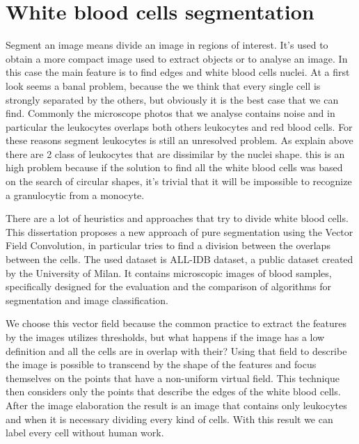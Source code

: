 \section*{White blood cells segmentation}
Segment an image means divide an image in regions of interest. It's used to obtain a more compact image used to extract objects or to analyse an image. In this case the main feature is to find edges and white blood cells nuclei. At a first look seems a banal problem, because the we think that every single cell is strongly separated by the others, but obviously it is the best case that we can find. Commonly the microscope photos that we analyse contains noise and in particular the leukocytes overlaps both others leukocytes and red blood cells. For these reasons segment leukocytes is still an unresolved problem. As explain above there are 2 class of leukocytes that are dissimilar by the nuclei shape. this is an high problem because if the solution to find all the white blood cells was based on the search of circular shapes, it's trivial that it will be impossible to recognize a granulocytic from a monocyte.


\bigskip


There are a lot of heuristics and approaches that try to divide white blood cells. This dissertation proposes a new approach of pure segmentation using the Vector Field Convolution, in particular tries to find a division between the overlaps between the cells. The used dataset is ALL-IDB dataset, a public dataset created by the University of Milan. It contains microscopic images of blood samples, specifically designed for the evaluation and the comparison of algorithms for segmentation and image classification.


\bigskip 


We choose this vector field because the common practice to extract the features by the images utilizes thresholds, but what happens if the image has a low definition and all the cells are in overlap with their? Using that field to describe the image is possible to transcend by the shape of the features and focus themselves on the points that have a non-uniform virtual field. This technique then considers only the points that describe the edges of the white blood cells. After the image elaboration the result is an image that contains only leukocytes and when it is necessary dividing every kind of cells. With this result we can label every cell without human work.


\bigskip


